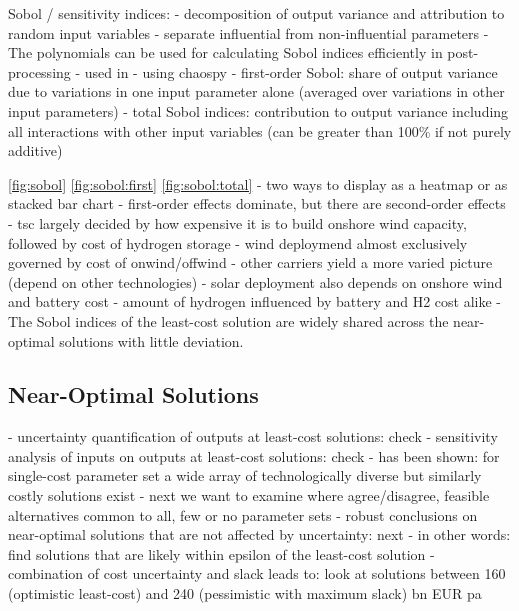 Sobol / sensitivity indices:
- decomposition of output variance and attribution to random input variables
- separate influential from non-influential parameters
- The polynomials can be used for calculating Sobol indices efficiently in post-processing \cite{sudret_global_2008}
- used in \cite{trondle_trade-offs_2020,mavromatidis_uncertainty_2018}
- using chaospy \cite{feinberg_chaospy_2015}
- first-order Sobol: share of output variance due to variations in one input parameter alone (averaged over variations in other input parameters)
- total Sobol indices: contribution to output variance including all interactions with other input variables (can be greater than 100\% if not purely additive)

\cref{fig:sobol} \cref{fig:sobol:first} \cref{fig:sobol:total}
- two ways to display as a heatmap or as stacked bar chart
- first-order effects dominate, but there are second-order effects
- tsc largely decided by how expensive it is to build onshore wind capacity, followed by cost of hydrogen storage
- wind deploymend almost exclusively governed by cost of onwind/offwind
- other carriers yield a more varied picture (depend on other technologies)
- solar deployment also depends on onshore wind and battery cost
- amount of hydrogen influenced by battery and H2 cost alike
- The Sobol indices of the least-cost solution are widely shared across the near-optimal solutions with little deviation.

\subsection{Near-Optimal Solutions}

- uncertainty quantification of outputs at least-cost solutions: check
- sensitivity analysis of inputs on outputs at least-cost solutions: check
- has been shown: for single-cost parameter set a wide array of technologically diverse but similarly costly solutions exist
- next we want to examine where agree/disagree, feasible alternatives common to all, few or no parameter sets
- robust conclusions on near-optimal solutions that are not affected by uncertainty: next
- in other words: find solutions that are likely within epsilon of the least-cost solution
- combination of cost uncertainty and slack leads to: look at solutions between 160 (optimistic least-cost) and 240 (pessimistic with maximum slack) bn EUR pa


